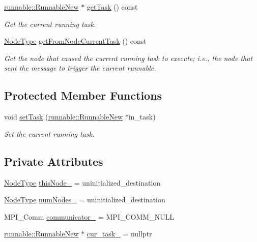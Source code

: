 \begin{DoxyCompactItemize}
\item 
\hyperlink{structvt_1_1runnable_1_1_runnable_new}{runnable\+::\+Runnable\+New} $\ast$ \hyperlink{structvt_1_1ctx_1_1_context_a4e78f77717329369173daf1b270a25b0}{get\+Task} () const
\begin{DoxyCompactList}\small\item\em Get the current running task. \end{DoxyCompactList}\item 
\hyperlink{namespacevt_a866da9d0efc19c0a1ce79e9e492f47e2}{Node\+Type} \hyperlink{structvt_1_1ctx_1_1_context_abde7b4c10accf2b8c2bc68210a15590d}{get\+From\+Node\+Current\+Task} () const
\begin{DoxyCompactList}\small\item\em Get the node that caused the current running task to execute; i.\+e., the node that sent the message to trigger the current runnable. \end{DoxyCompactList}\end{DoxyCompactItemize}
\subsection*{Protected Member Functions}
\begin{DoxyCompactItemize}
\item 
void \hyperlink{structvt_1_1ctx_1_1_context_a81b5dbccaaca10fcce4ed7c89ceca38c}{set\+Task} (\hyperlink{structvt_1_1runnable_1_1_runnable_new}{runnable\+::\+Runnable\+New} $\ast$in\+\_\+task)
\begin{DoxyCompactList}\small\item\em Set the current running task. \end{DoxyCompactList}\end{DoxyCompactItemize}
\subsection*{Private Attributes}
\begin{DoxyCompactItemize}
\item 
\hyperlink{namespacevt_a866da9d0efc19c0a1ce79e9e492f47e2}{Node\+Type} \hyperlink{structvt_1_1ctx_1_1_context_a5fcea79d2fede6e9945433621894624c}{this\+Node\+\_\+} = uninitialized\+\_\+destination
\item 
\hyperlink{namespacevt_a866da9d0efc19c0a1ce79e9e492f47e2}{Node\+Type} \hyperlink{structvt_1_1ctx_1_1_context_a58cc20215314e915f43b829ad0470299}{num\+Nodes\+\_\+} = uninitialized\+\_\+destination
\item 
M\+P\+I\+\_\+\+Comm \hyperlink{structvt_1_1ctx_1_1_context_ac9f5afa2cb9a6c06c8570bbf25cde926}{communicator\+\_\+} = M\+P\+I\+\_\+\+C\+O\+M\+M\+\_\+\+N\+U\+LL
\item 
\hyperlink{structvt_1_1runnable_1_1_runnable_new}{runnable\+::\+Runnable\+New} $\ast$ \hyperlink{structvt_1_1ctx_1_1_context_a3608ed3fc79eac87b49d38f49bdc7486}{cur\+\_\+task\+\_\+} = nullptr
\end{DoxyCompactItemize}
